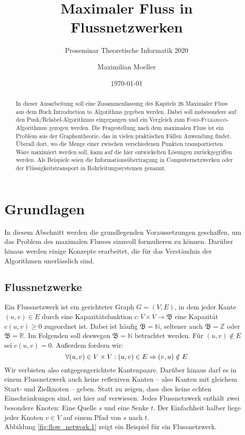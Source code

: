 \documentclass[12pt,a4paper,titlepage,onecolumn,ngerman,bibliography=totocnumbered]{scrartcl}
\author{Maximilian Moeller}
\title{Maximaler Fluss in Flussnetzwerken}
\subtitle{Proseminar Theoretische Informatik 2020}
\date{\today}
\theoremstyle{definition}
\theoremstyle{remark}
\newcommand{\ff}{\textsc{Ford-Fulkerson}}
\newcommand{\pr}{Push/Relabel}
\begin{document}
\maketitle
\tableofcontents

\begin{abstract}
In dieser Ausarbeitung soll eine Zusammenfassung des Kapitels 26 \glqq Maximaler Fluss\grqq{} aus dem Buch \glqq Introduction to Algorithms\grqq{} \parencite{Cormen09} gegeben werden. 
Dabei soll insbesondere auf den \pr -Algorithmus eingegangen und ein Vergleich zum \ff -Algorithmus gezogen werden.
\medbreak
Die Fragestellung nach dem maximalen Fluss ist ein Problem aus der Graphentheorie, das
in vielen praktischen Fällen Anwendung findet. 
Überall dort, wo die Menge einer zwischen verschiedenen Punkten transportierten Ware maximiert werden soll, kann auf die hier entwickelten Lösungen zurückgegriffen werden. 
Als Beispiele seien die Informationsübertragung in Computernetzwerken oder der Flüssigkeitstransport in Rohrleitungssystemen genannt. 
\end{abstract}

\section{Grundlagen}
In diesem Abschnitt werden die grundlegenden Voraussetzungen geschaffen, um das Problem des maximalen Flusses sinnvoll formulieren zu können.
Darüber hinaus werden einige Konzepte erarbeitet, die für das Verständnis der Algorithmen unerlässlich sind.

\subsection{Flussnetzwerke}
Ein Flussnetzwerk ist ein gerichteter Graph $G = (V,E)$, in dem jeder Kante $(u,v) \in E$ durch eine Kapazitätsfunktion $c: V\times V\to\mathfrak{B}$ eine Kapazität $c(u,v) \geq 0$ zugeordnet ist.
Dabei ist häufig $\mathfrak{B} = \mathbb{N}$, seltener auch $\mathfrak{B} = \mathbb{Z}$ oder $\mathfrak{B} = \mathbb{R}$.
Im Folgenden soll deswegen $\mathfrak{B} = \mathbb{N}$ betrachtet werden.
Für $(u,v) \notin E$ sei $c(u,v) = 0$.
Außerdem fordern wir:
\begin{equation} \label{no_parallel}
\forall (u,v)\in V\times V: (u,v)\in E \Rightarrow (v,u)\notin E\\
\end{equation}
Wir verbieten also entgegengerichtete Kantenpaare.
Darüber hinaus darf es in einem Flussnetzwerk auch keine reflexiven Kanten -- also Kanten mit gleichem Start- und Zielknoten -- geben.
Statt zu zeigen, dass dies keine echten Einschränkungen sind, sei hier auf \cite[][S. 724 f.]{Cormen09} verwiesen.
\medbreak
Jedes Flussnetzwerk enthält zwei besondere Knoten: Eine Quelle $s$ und eine Senke $t$.
Der Einfachheit halber liege jeder Knoten $v \in V$ auf einem Pfad von $s$ nach $t$.\\
Abbildung \ref{fig:flow_network.1} zeigt ein Beispiel für ein Flussnetzwerk.
\end{document}

